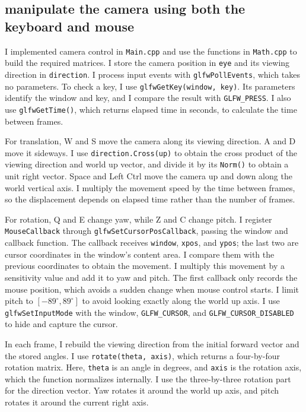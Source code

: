 \documentclass[acmtog]{acmart}
\begin{document}
\subsection{manipulate the camera using both the keyboard and mouse}
I implemented camera control in \texttt{Main.cpp} and use the functions in \texttt{Math.cpp} to build the required matrices. I store the camera position in \texttt{eye} and its viewing direction in \texttt{direction}. I process input events with \texttt{glfwPollEvents}, which takes no parameters. To check a key, I use \texttt{glfwGetKey(window, key)}. Its parameters identify the window and key, and I compare the result with \texttt{GLFW\_PRESS}. I also use \texttt{glfwGetTime()}, which returns elapsed time in seconds, to calculate the time between frames.

For translation, W and S move the camera along its viewing direction. A and D move it sideways. I use \texttt{direction.Cross(up)} to obtain the cross product of the viewing direction and world up vector, and divide it by its \texttt{Norm()} to obtain a unit right vector. Space and Left Ctrl move the camera up and down along the world vertical axis. I multiply the movement speed by the time between frames, so the displacement depends on elapsed time rather than the number of frames.

For rotation, Q and E change yaw, while Z and C change pitch. I register \texttt{MouseCallback} through \texttt{glfwSetCursorPosCallback}, passing the window and callback function. The callback receives \texttt{window}, \texttt{xpos}, and \texttt{ypos}; the last two are cursor coordinates in the window's content area. I compare them with the previous coordinates to obtain the movement. I multiply this movement by a sensitivity value and add it to yaw and pitch. The first callback only records the mouse position, which avoids a sudden change when mouse control starts. I limit pitch to $[-89^\circ,89^\circ]$ to avoid looking exactly along the world up axis. I use \texttt{glfwSetInputMode} with the window, \texttt{GLFW\_CURSOR}, and \texttt{GLFW\_CURSOR\_DISABLED} to hide and capture the cursor.

In each frame, I rebuild the viewing direction from the initial forward vector and the stored angles. I use \texttt{rotate(theta, axis)}, which returns a four-by-four rotation matrix. Here, \texttt{theta} is an angle in degrees, and \texttt{axis} is the rotation axis, which the function normalizes internally. I use the three-by-three rotation part for the direction vector. Yaw rotates it around the world up axis, and pitch rotates it around the current right axis.
\end{document}
